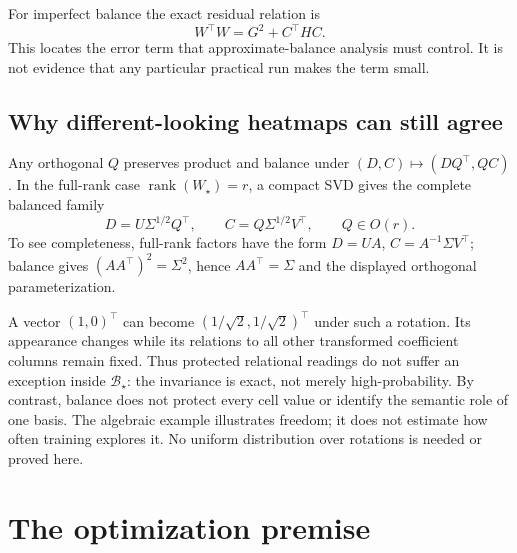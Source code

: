 For imperfect balance the exact residual relation is
\begin{equation}\label{eq:residual}
 W^\top W=G^2+C^\top HC.
\end{equation}
This locates the error term that approximate-balance analysis must control. It is not evidence that any particular practical run makes the term small.

\subsection{Why different-looking heatmaps can still agree}
Any orthogonal $Q$ preserves product and balance under $(D,C)\mapsto(DQ^\top,QC)$. In the full-rank case $\operatorname{rank}(W_\star)=r$, a compact SVD gives the complete balanced family
\begin{equation}
 D=U\Sigma^{1/2}Q^\top,\qquad C=Q\Sigma^{1/2}V^\top,\qquad Q\in O(r).
\end{equation}
To see completeness, full-rank factors have the form $D=UA$, $C=A^{-1}\Sigma V^\top$; balance gives $(AA^\top)^2=\Sigma^2$, hence $AA^\top=\Sigma$ and the displayed orthogonal parameterization.

A vector $(1,0)^\top$ can become $(1/\sqrt2,1/\sqrt2)^\top$ under such a rotation. Its appearance changes while its relations to all other transformed coefficient columns remain fixed. Thus protected relational readings do not suffer an exception inside $\mathcal B_\star$: the invariance is exact, not merely high-probability. By contrast, balance does not protect every cell value or identify the semantic role of one basis. The algebraic example illustrates freedom; it does not estimate how often training explores it. No uniform distribution over rotations is needed or proved here.

\section{The optimization premise}
